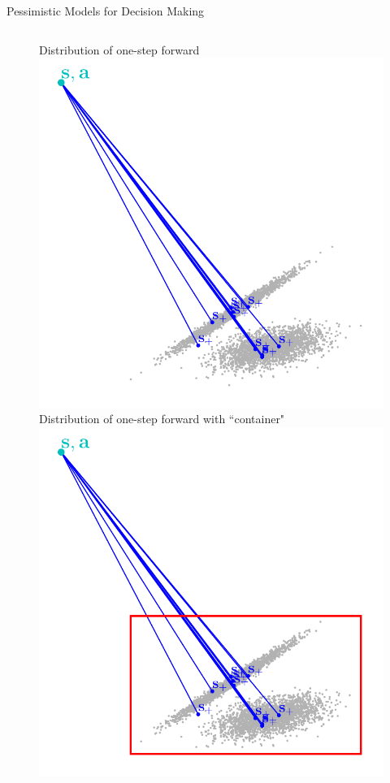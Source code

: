 \documentclass[lecture]{beamer}
\begin{document}
\begin{frame}{\normalsize Pessimistic Models for Decision Making}
\begin{columns}[t]
  \begin{overlayarea}{\textwidth}{1\textheight}
    \begin{figure}
     \newcommand{\FS}{1}
        {
        \center
        Distribution of one-step forward
	\includegraphics[width=1\textwidth,clip]{Codes/BasicsSafety/PessimisticOneStep0.pdf}
	}
        {
        \center
        Distribution of one-step forward with ``container"
	\includegraphics[width=1\textwidth,clip]{Codes/BasicsSafety/PessimisticOneStep1.pdf}
}
\end{figure}
\end{overlayarea}
\end{columns}
\end{frame}
\end{document}

